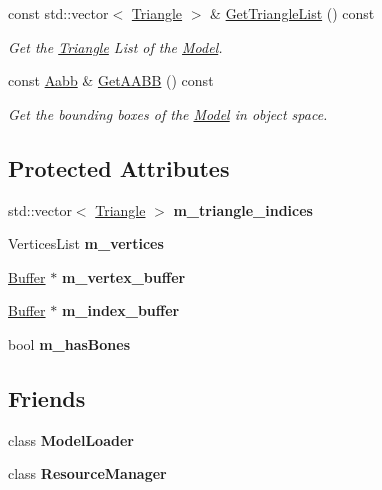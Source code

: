 \begin{DoxyCompactItemize}
const std\+::vector$<$ \hyperlink{structModel_1_1Triangle}{Triangle} $>$ \& \hyperlink{classModel_a4bceb2cedfa99f87ae84763d27a00986}{Get\+Triangle\+List} () const
\begin{DoxyCompactList}\small\item\em Get the \hyperlink{structModel_1_1Triangle}{Triangle} List of the \hyperlink{classModel}{Model}. \end{DoxyCompactList}\item 
const \hyperlink{classAabb}{Aabb} \& \hyperlink{classModel_a3dd43b49bf52682994f40fa7303bcf20}{Get\+A\+A\+BB} () const
\begin{DoxyCompactList}\small\item\em Get the bounding boxes of the \hyperlink{classModel}{Model} in object space. \end{DoxyCompactList}\end{DoxyCompactItemize}
\subsection*{Protected Attributes}
\begin{DoxyCompactItemize}
\item 
\mbox{\label{classModel_a51e447ea04f6d3bf69c1c202329ee2b8}} 
std\+::vector$<$ \hyperlink{structModel_1_1Triangle}{Triangle} $>$ {\bfseries m\+\_\+triangle\+\_\+indices}
\item 
\mbox{\label{classModel_a982acd4df21f2fb90d583a11936a78ca}} 
Vertices\+List {\bfseries m\+\_\+vertices}
\item 
\mbox{\label{classModel_a295c0501a70eefeaf1f229ed8b40ec20}} 
\hyperlink{classBuffer}{Buffer} $\ast$ {\bfseries m\+\_\+vertex\+\_\+buffer}
\item 
\mbox{\label{classModel_a3e9022d69f8be6082af1435b0874fba2}} 
\hyperlink{classBuffer}{Buffer} $\ast$ {\bfseries m\+\_\+index\+\_\+buffer}
\item 
\mbox{\label{classModel_aee6bb51234b290c65fce759602a624c9}} 
bool {\bfseries m\+\_\+has\+Bones}
\end{DoxyCompactItemize}
\subsection*{Friends}
\begin{DoxyCompactItemize}
\item 
\mbox{\label{classModel_ac22dade55c1e8f81ea3e0892cd321190}} 
class {\bfseries Model\+Loader}
\item 
\mbox{\label{classModel_a54c1252abc87a78a301e6b6984470408}} 
class {\bfseries Resource\+Manager}
\end{DoxyCompactItemize}


